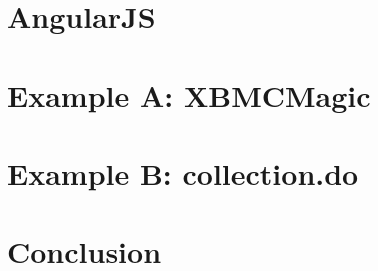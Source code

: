 

\chapter{AngularJS}






\chapter{Example A: XBMCMagic}
\label{ch:xbmc}





\chapter{Example B: collection.do}
\label{ch:collection}





\chapter{Conclusion}
